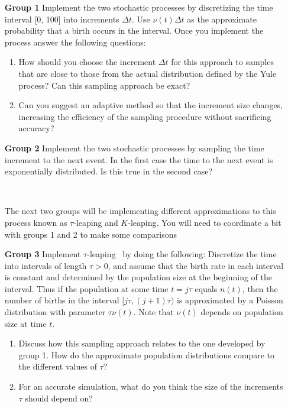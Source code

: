 \documentclass[12pt]{article}
\begin{document}
\begin{enumerate}
\item[\bf Group 1] 
Implement the two stochastic processes by discretizing the time interval [0, 100] into increments $\Delta t$. Use $\nu(t)\Delta t$ as the approximate probability that a birth occurs in the interval. Once you implement the process answer the following questions:
\begin{enumerate}
	\item How should you choose the increment $\Delta t$ for this approach to samples that are close to those from the actual distribution defined by the Yule process? Can this sampling approach be exact?
	\item Can you suggest an adaptive method so that the increment size changes, increasing the efficiency of the sampling procedure without sacrificing accuracy?

\end{enumerate}

\item[\bf Group 2] 
	Implement the two stochastic processes by sampling the time increment to the next event. In the first case the time to the next event is exponentially distributed. Is this true in the second case?
	
\
	
	The next two groups will be implementing different approximations to this process known as $\tau$-leaping and $K$-leaping. You will need to coordinate a bit with groups 1 and 2 to make some comparisons
	
\item[\bf Group 3] 
	Implement $\tau$-leaping~\cite{cao06} by doing the following: Discretize the time into intervals of length $\tau > 0$, and assume that the birth rate in each interval is constant and determined by the population size at the beginning of the interval. Thus if the population at some time $t = j\tau$ equals $n(t)$, then the number of births in the interval $[j\tau,(j + 1)\tau)$ is approximated by a Poisson distribution with parameter $\tau\nu(t)$. Note that $\nu(t)$ depends on population size at time $t$.

\begin{enumerate}
	\item Discuss how this sampling approach relates to the one developed by group 1. How do the approximate population distributions compare to the different values of $\tau$?
	\item For an accurate simulation, what do you think the size of the increments $\tau$ should depend on?
\end{enumerate}
	

\end{enumerate}
\end{document}
